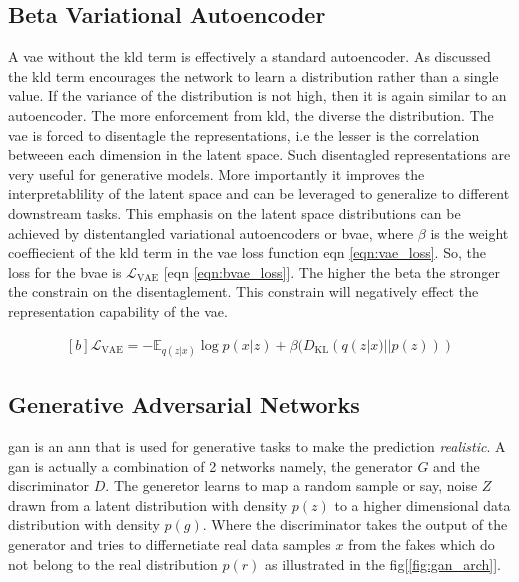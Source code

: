 \subsection{Beta Variational Autoencoder}

A \ac{vae} without the \ac{kld} term is effectively a standard autoencoder. As discussed the \ac{kld} term encourages the network to learn a distribution rather than a single value. If the variance of the distribution is not high, then it is again similar to an autoencoder. The more enforcement from \ac{kld}, the diverse the distribution. The \ac{vae} is forced to disentagle the representations, i.e the lesser is the correlation betweeen each dimension in the latent space. Such disentagled representations are very useful for generative models. More importantly it improves the interpretablility of the latent space and can be leveraged to generalize to different downstream tasks. This emphasis on the latent space distributions can be achieved by distentangled variational autoencoders or \ac{bvae}, where $\beta$ is the weight coeffiecient of the \ac{kld} term in the \ac{vae} loss function eqn \ref{eqn:vae_loss}. So, the loss for the \ac{bvae} is $\mathcal{L}_{\mathrm{VAE}}$ [eqn \ref{eqn:bvae_loss}]. The higher the beta the stronger the constrain on the disentaglement. This constrain will negatively effect the representation capability of the \ac{vae}.

\begin{equation} \label{eqn:bvae_loss}
    \begin{gathered}[b]
        \mathcal{L}_{\mathrm{VAE}}=-\mathbb{E}_{q(z | x)} \log p(x | z) + \beta (D_{\mathrm{KL}}(q(z | x) || p(z)))
    \end{gathered}
\end{equation}

\subsection{Generative Adversarial Networks}
\ac{gan} is an \ac{ann} that is used for generative tasks to make the prediction \textit{realistic}. A \ac{gan} is actually a combination of 2 networks namely, the generator $G$ and the discriminator $D$. The generetor learns to map a random sample or say, noise $Z$ drawn from a latent distribution with density $p(z)$ to a higher dimensional data distribution with density $p(g)$. Where the discriminator takes the output of the generator and tries to differnetiate real data samples $x$ from the fakes which do not belong to the real distribution $p(r)$  as illustrated in the fig[\ref{fig:gan_arch}].

